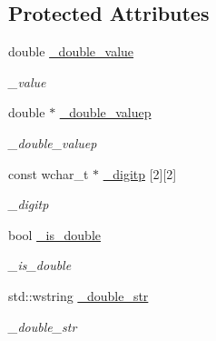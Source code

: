 \subsection*{Protected Attributes}
\begin{DoxyCompactItemize}
\item 
double \hyperlink{classformat_1_1number_a0d0d3ea72aa600fe3dcc2e9d798db439}{\+\_\+double\+\_\+value}\hypertarget{classformat_1_1number_a0d0d3ea72aa600fe3dcc2e9d798db439}{}\label{classformat_1_1number_a0d0d3ea72aa600fe3dcc2e9d798db439}

\begin{DoxyCompactList}\small\item\em \+\_\+value \end{DoxyCompactList}\item 
double $\ast$ \hyperlink{classformat_1_1number_ae74cb78649b9c7ba78aa0456f1e717d8}{\+\_\+double\+\_\+valuep}\hypertarget{classformat_1_1number_ae74cb78649b9c7ba78aa0456f1e717d8}{}\label{classformat_1_1number_ae74cb78649b9c7ba78aa0456f1e717d8}

\begin{DoxyCompactList}\small\item\em \+\_\+double\+\_\+valuep \end{DoxyCompactList}\item 
const wchar\+\_\+t $\ast$ \hyperlink{classformat_1_1number_a805af432cff44555cb9d67ad6e7b8cff}{\+\_\+digitp} \mbox{[}2\mbox{]}\mbox{[}2\mbox{]}\hypertarget{classformat_1_1number_a805af432cff44555cb9d67ad6e7b8cff}{}\label{classformat_1_1number_a805af432cff44555cb9d67ad6e7b8cff}

\begin{DoxyCompactList}\small\item\em \+\_\+digitp \end{DoxyCompactList}\item 
bool \hyperlink{classformat_1_1number_a7bd3d15960507f43636f50c1d8cee360}{\+\_\+is\+\_\+double}\hypertarget{classformat_1_1number_a7bd3d15960507f43636f50c1d8cee360}{}\label{classformat_1_1number_a7bd3d15960507f43636f50c1d8cee360}

\begin{DoxyCompactList}\small\item\em \+\_\+is\+\_\+double \end{DoxyCompactList}\item 
std\+::wstring \hyperlink{classformat_1_1number_ad3c83c898afea692b14718ef4da12a13}{\+\_\+double\+\_\+str}\hypertarget{classformat_1_1number_ad3c83c898afea692b14718ef4da12a13}{}\label{classformat_1_1number_ad3c83c898afea692b14718ef4da12a13}

\begin{DoxyCompactList}\small\item\em \+\_\+double\+\_\+str \end{DoxyCompactList}\end{DoxyCompactItemize}
